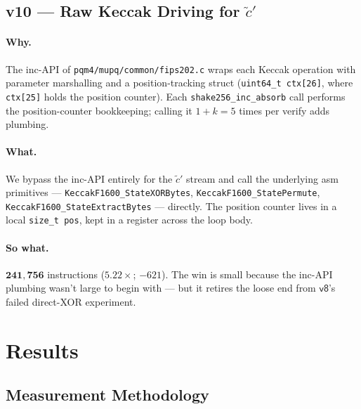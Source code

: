 \documentclass[11pt,a4paper]{article}
\begin{document}
\subsection{v10 --- Raw Keccak Driving for \texorpdfstring{$\tilde c'$}{c-tilde-prime}}

\paragraph{Why.} The inc-API of \texttt{pqm4/mupq/common/fips202.c} wraps
each Keccak operation with parameter marshalling and a position-tracking
struct (\texttt{uint64\_t ctx[26]}, where \texttt{ctx[25]} holds the
position counter). Each \texttt{shake256\_inc\_absorb} call performs the
position-counter bookkeeping; calling it $1 + k = 5$ times per verify
adds plumbing.

\paragraph{What.} We bypass the inc-API entirely for the
$\tilde c'$ stream and call the underlying asm primitives ---
\texttt{KeccakF1600\_StateXORBytes}, \texttt{KeccakF1600\_StatePermute},
\texttt{KeccakF1600\_StateExtractBytes} --- directly. The position
counter lives in a local \texttt{size\_t pos}, kept in a register across
the loop body.

\paragraph{So what.} $\mathbf{241{,}756}$ instructions
($\mathbf{5.22\times}$; $-621$). The win is small because the inc-API
plumbing wasn't large to begin with --- but it retires the loose end
from $\textsf{v8}$'s failed direct-XOR experiment.

\section{Results}
\label{sec:results}

\subsection{Measurement Methodology}
\end{document}
